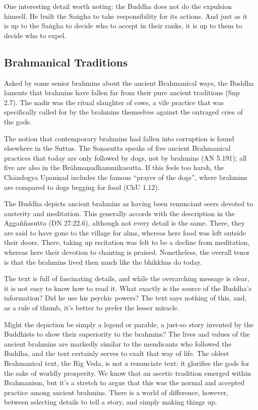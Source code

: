 \documentclass[12pt,openany]{book}%
\begin{document}
One interesting detail worth noting: the Buddha does not do the expulsion himself. He built the \textsanskrit{Saṅgha} to take responsibility for its actions. And just as it is up to the \textsanskrit{Saṅgha} to decide who to accept in their ranks, it is up to them to decide who to expel.

\subsection*{Brahmanical Traditions}

Asked by some senior brahmins about the ancient Brahmanical ways, the Buddha laments that brahmins have fallen far from their pure ancient traditions (Snp 2.7). The nadir was the ritual slaughter of cows, a vile practice that was specifically called for by the brahmins themselves against the outraged cries of the gods.

The notion that contemporary brahmins had fallen into corruption is found elsewhere in the Suttas. The \textsanskrit{Soṇasutta} speaks of five ancient Brahmanical practices that today are only followed by dogs, not by brahmins (AN 5.191); all five are also in the \textsanskrit{Brāhmaṇadhammikasutta}. If this feels too harsh, the \textsanskrit{Chāndogya} \textsanskrit{Upaniṣad} includes the famous “prayer of the dogs”, where brahmins are compared to dogs begging for food (ChU 1.12).

The Buddha depicts ancient brahmins as having been renunciant seers devoted to austerity and meditation. This generally accords with the description in the \textsanskrit{Aggaññasutta} (DN 27:22.6), although not every detail is the same. There, they are said to have gone to the village for alms, whereas here food was left outside their doors. There, taking up recitation was felt to be a decline from meditation, whereas here their devotion to chanting is praised. Nonetheless, the overall tenor is that the brahmins lived then much like the bhikkhus do today.

The text is full of fascinating details, and while the overarching message is clear, it is not easy to know how to read it. What exactly is the source of the Buddha’s information? Did he use his psychic powers? The text says nothing of this, and, as a rule of thumb, it’s better to prefer the lesser miracle.

Might the depiction be simply a legend or parable, a just-so story invented by the Buddhists to show their superiority to the brahmins? The lives and values of the ancient brahmins are markedly similar to the mendicants who followed the Buddha, and the text certainly serves to exalt that way of life. The oldest Brahmanical text, the Rig Veda, is not a renunciate text; it glorifies the gods for the sake of worldly prosperity. We know that an ascetic tradition emerged within Brahmanism, but it’s a stretch to argue that this was the normal and accepted practice among ancient brahmins. There is a world of difference, however, between selecting details to tell a story, and simply making things up.
\end{document}
